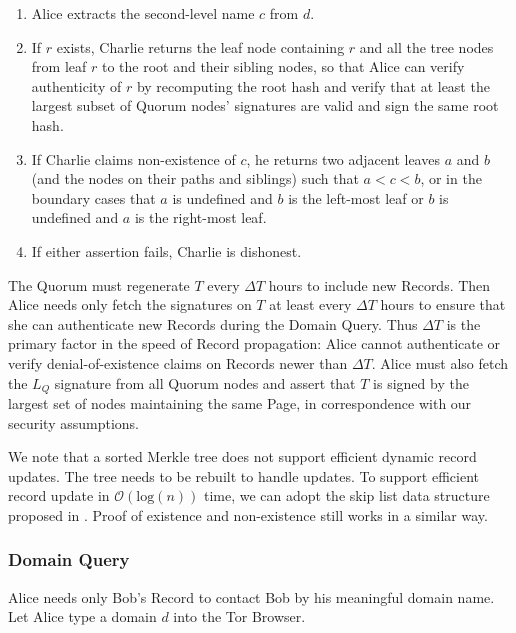 \documentclass[USenglish,oneside,twocolumn]{article}
\begin{document}
\begin{enumerate}
	\item Alice extracts the second-level name $ c $ from $ d $.
	\item If $ r $ exists, Charlie returns the leaf node containing $ r $ and all the tree nodes from leaf $ r $ to the root and their sibling nodes, so that Alice can verify authenticity of $ r $ by recomputing the root hash and verify that at least the largest subset of Quorum nodes' signatures are valid and sign the same root hash.	
	\item If Charlie claims non-existence of $ c $, he returns two adjacent leaves $ a $ and $ b $ (and the nodes on their paths and siblings) such that $ a < c < b $, or in the boundary cases that $ a $ is undefined and $ b $ is the left-most leaf or $ b $ is undefined and $ a $ is the right-most leaf.
	\item If either assertion fails, Charlie is dishonest.
\end{enumerate}

The Quorum must regenerate $ T $ every $ \Delta T $ hours to include new Records. Then Alice needs only fetch the signatures on $ T $ at least every $ \Delta T $ hours to ensure that she can authenticate new Records during the Domain Query. Thus $ \Delta T $ is the primary factor in the speed of Record propagation: Alice cannot authenticate or verify denial-of-existence claims on Records newer than $ \Delta T $. Alice must also fetch the $ L_{Q} $ signature from all Quorum nodes and assert that $ T $ is signed by the largest set of nodes maintaining the same Page, in correspondence with our security assumptions.

We note that a sorted Merkle tree does not support efficient dynamic record updates. The tree needs to be rebuilt to handle updates. To support efficient record update in $ \mathcal{O}(\mathrm{log}(n)) $ time, we can adopt the skip list data structure proposed in  \cite{goodrich2001implementation}. Proof of existence and non-existence still works in a similar way.

\subsubsection{Domain Query} %

Alice needs only Bob's Record to contact Bob by his meaningful domain name. Let Alice type a domain $ d $ into the Tor Browser.
\end{document}
